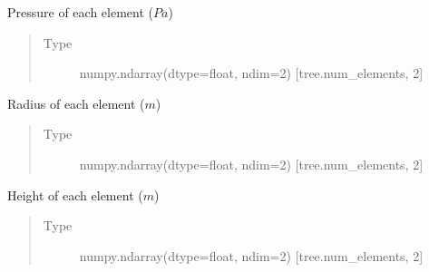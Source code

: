 \documentclass[letterpaper,10pt,english]{sphinxmanual}
\begin{document}
\begin{fulllineitems}
\begin{fulllineitems}
\begin{quote}
\begin{description}
\end{description}\end{quote}

\end{fulllineitems}


\begin{fulllineitems}
\label{\detokenize{index:src.tree.Tree.pressure}}
Pressure of each element (\(Pa\))
\begin{quote}\begin{description}
\item[{Type}] \leavevmode
numpy.ndarray(dtype=float, ndim=2) {[}tree.num\_elements, 2{]}

\end{description}\end{quote}

\end{fulllineitems}


\begin{fulllineitems}
\label{\detokenize{index:src.tree.Tree.element_radius}}
Radius of each element (\(m\))
\begin{quote}\begin{description}
\item[{Type}] \leavevmode
numpy.ndarray(dtype=float, ndim=2) {[}tree.num\_elements, 2{]}

\end{description}\end{quote}

\end{fulllineitems}


\begin{fulllineitems}
\label{\detokenize{index:src.tree.Tree.element_height}}
Height of each element (\(m\))
\begin{quote}\begin{description}
\item[{Type}] \leavevmode
numpy.ndarray(dtype=float, ndim=2) {[}tree.num\_elements, 2{]}


\end{description}
\end{quote}
\end{fulllineitems}
\end{fulllineitems}
\end{document}
